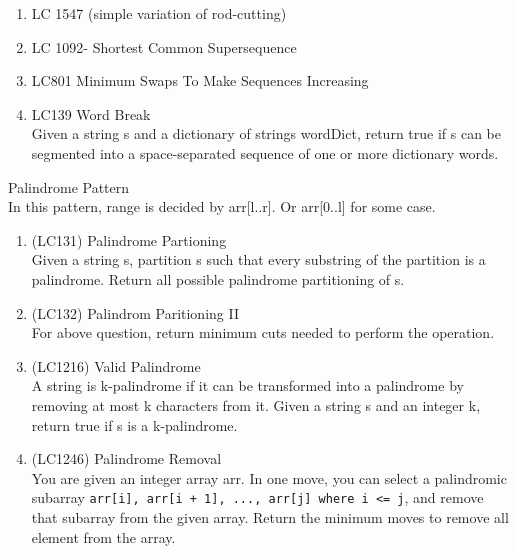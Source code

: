\begin{exercise}
\begin{enumerate}
    \item LC 1547 (simple variation of rod-cutting)
    \item LC 1092- Shortest Common Supersequence
    \item LC801 Minimum Swaps To Make Sequences Increasing 
    \item LC139 Word Break\\ Given a string s and a dictionary of strings wordDict, return true if s can be segmented into a space-separated sequence of one or more dictionary words.
\end{enumerate}


    { \Large Palindrome Pattern \\}
    In this pattern, range is decided by arr[l..r]. Or arr[0..l] for some case.
    \begin{enumerate}
        \item (LC131) Palindrome Partioning \\Given a string s, partition s such that every substring of the partition is a palindrome. Return all possible palindrome partitioning of s. 
        
        \item (LC132) Palindrom Paritioning II \\ For above question, return minimum cuts needed to perform the operation.

        \item (LC1216) Valid Palindrome \\A string is k-palindrome if it can be transformed into a palindrome by removing at most k characters from it. Given a string s and an integer k, return true if s is a k-palindrome.

        \item (LC1246) Palindrome Removal\\ You are given an integer array arr.
        In one move, you can select a palindromic subarray \verb|arr[i], arr[i + 1], ..., arr[j] where i <= j|, and remove that subarray from the given array.
        Return the minimum moves to remove all element from the array.

    \end{enumerate}

\end{exercise}

